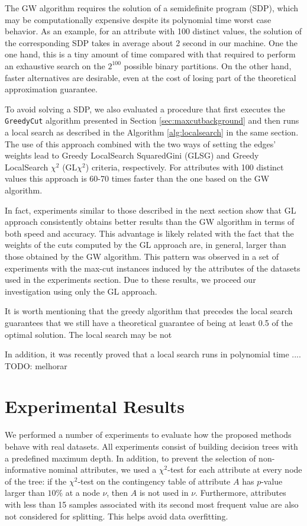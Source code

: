 The GW algorithm  requires  the solution of a semidefinite program (SDP),
which may be computationally expensive despite  its 
polynomial time worst
case  behavior.
As an example, for an attribute with 100 distinct values, the solution of
the corresponding SDP takes in average about 2 second in our machine.
One the one hand, this is a tiny amount of time 
compared with that required to perform an exhaustive search on the $2^{100}$
possible binary partitions. On the other hand, 
 faster alternatives are desirable, even
at the cost of losing part of the theoretical approximation guarantee. 

To avoid solving a SDP, 
we also evaluated a procedure
that first executes the {\tt GreedyCut} algorithm presented
in Section \ref{sec:maxcutbackground} and then runs a local search as described
in the Algorithm  \ref{alg:localsearch} in the same section. 
The use of this approach combined with the two
ways of setting the edges' weights lead to
 Greedy LocalSearch SquaredGini (GLSG) and 
Greedy LocalSearch $\chi^2$ (GL$\chi^2$) 
criteria, respectively.
For attributes with 100 distinct values this approach is 60-70
times faster than the one based on the GW algorithm.


In fact, experiments similar to those described in the next section
 show that  GL approach consistently obtains better results  than
the GW algorithm in terms of both speed and accuracy. 
This advantage is likely   related with the fact 
 that the weights of the cuts computed by the GL approach are, in general, larger
than those obtained by the GW algorithm. This pattern
was observed in a set of  experiments with the max-cut instances 
induced by the attributes of the datasets used in the experiments section.
Due to these results, we proceed our investigation using only 
the GL approach.


It is worth mentioning that the greedy algorithm that precedes the local search
guarantees that we  still have a theoretical guarantee
of being at least 0.5 of the optimal solution. The local
search may be not 

In addition, it was recently  proved that a local search 
runs in polynomial time ....
TODO: melhorar 


\section{Experimental Results}
We performed a number of experiments to evaluate how the
proposed methods behave with real datasets.
All experiments consist of building decision trees
with a predefined maximum depth.  In addition,
to prevent the selection of non-informative nominal attributes, 
we used a $\chi^2$-test for each attribute at every node of
the tree: if the $\chi^2$-test  on the contingency table of attribute $A$
has $p$-value larger than $10\%$ at a node $\nu$, then
$A$ is not used in $\nu$.
Furthermore, attributes with less than 15 samples associated with its
second most frequent value
are also not considered for splitting. This helps  avoid data overfitting.


